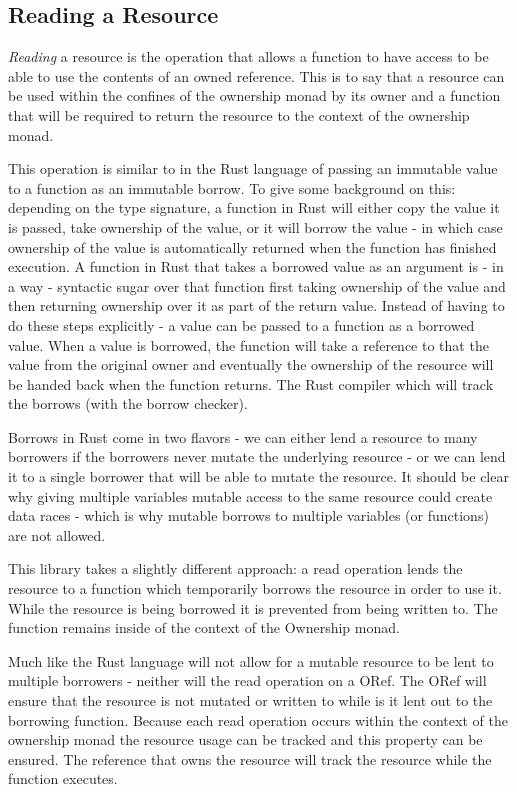 \documentclass[onehalf,11pt]{beavtex}
\begin{document}
\subsection{Reading a Resource}

\textit{Reading} a resource is the operation that allows a function to have
access to be able to use the contents of an owned reference.
This is to say that a resource can be used within the confines of the ownership
monad by its owner and a function that will be required to return the resource
to the context of the ownership monad.

This operation is similar to in the Rust language of passing an immutable value to
a function as an immutable borrow. %
To give some background on this: depending on the type signature, a function in
Rust will either copy the value it is passed, take ownership of the value, or it
will borrow the value - in which case ownership of the value is automatically
returned when the function has finished execution.\cite{rust_book_ownership}
A function in Rust that takes a borrowed value as an argument is - in a way -
syntactic sugar over that function first taking ownership of the value and then
returning ownership over it as part of the return value.
Instead of having to do these steps explicitly - a value can be passed to a
function as a borrowed value.  When a value is borrowed, the function will take
a reference to that the value from the original owner and eventually the
ownership of the resource will be handed back when the function returns.
The Rust compiler which will track the borrows (with the borrow checker).

Borrows in Rust come in two flavors - we can either lend a resource to many
borrowers if the borrowers never mutate the underlying resource - or we can
lend it to a single borrower that will be able to mutate the
resource.\cite{rust_book_borrowing}
It should be clear why giving multiple variables mutable access to
the same resource could create data races - which is why mutable borrows to
multiple variables (or functions) are not allowed.

This library takes a slightly different approach: a read operation
lends the resource to a function which temporarily borrows the resource
in order to use it. While the resource is being borrowed it is prevented
from being written to. The function remains inside of the context of the
Ownership monad.

Much like the Rust language will not allow for a mutable resource to be lent to
multiple borrowers - neither will the read operation on a ORef.
The ORef will ensure that the resource is not mutated or written to while is it
lent out to the borrowing function. 
Because each read operation occurs within the context of the ownership monad the
resource usage can be tracked and this property can be ensured.
The reference that owns the resource will track the resource while the 
function executes.
\end{document}
